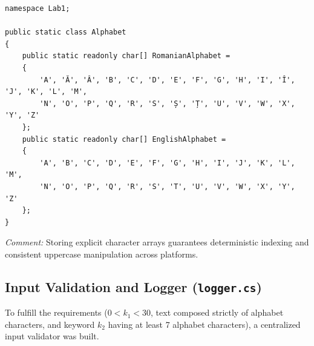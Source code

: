 \documentclass[12pt,a4paper]{article}
\begin{document}
\begin{lstlisting}[style=csharpstyle, caption={Romanian and English alphabets defined in Alphabet.cs}]
namespace Lab1;

public static class Alphabet
{
    public static readonly char[] RomanianAlphabet = 
    {
        'A', 'Ă', 'Â', 'B', 'C', 'D', 'E', 'F', 'G', 'H', 'I', 'Î', 'J', 'K', 'L', 'M',
        'N', 'O', 'P', 'Q', 'R', 'S', 'Ș', 'Ț', 'U', 'V', 'W', 'X', 'Y', 'Z'
    };
    public static readonly char[] EnglishAlphabet = 
    {
        'A', 'B', 'C', 'D', 'E', 'F', 'G', 'H', 'I', 'J', 'K', 'L', 'M',
        'N', 'O', 'P', 'Q', 'R', 'S', 'T', 'U', 'V', 'W', 'X', 'Y', 'Z'
    };
}
\end{lstlisting}
\textit{Comment:} Storing explicit character arrays guarantees deterministic indexing and consistent uppercase manipulation across platforms.

\subsection{Input Validation and Logger (\texttt{logger.cs})}
To fulfill the requirements ($0 < k_1 < 30$, text composed strictly of alphabet characters, and keyword $k_2$ having at least 7 alphabet characters), a centralized input validator was built.
\end{document}
